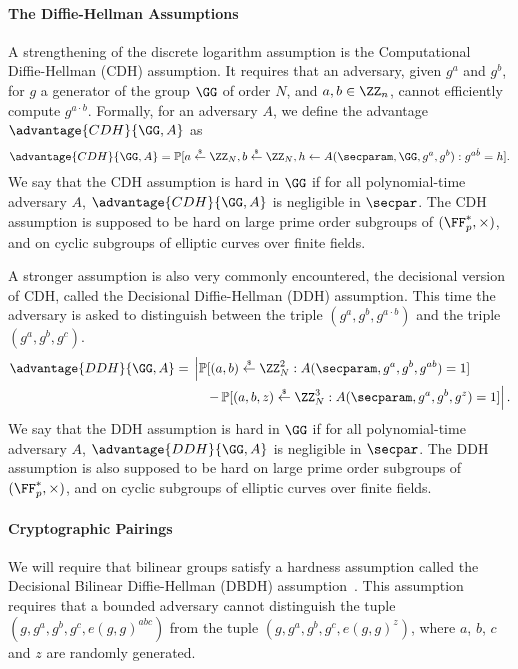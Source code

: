 
\paragraph{The Diffie-Hellman Assumptions} %
\label{par:def_DH}

A strengthening of the discrete logarithm assumption is the Computational Diffie-Hellman (CDH) assumption.
It requires that an adversary, given $g^a$ and $g^b$, for $g$ a generator of the group $\GG$ of order $N$, and $a,b \in \ZZ_n$, cannot efficiently compute $g^{a \cdot b}$.
Formally, for an adversary $A$, we define the advantage $\advantage{CDH}{\GG, A}$ as
\[
	\advantage{CDH}{\GG, A} = \Prob[a \getsr \ZZ_N, b \getsr \ZZ_N, h \gets A(\secparam, \GG, g^a, g^b) :  g^{a \dot b} = h ].
\]
We say that the CDH assumption is hard in $\GG$ if for all polynomial-time adversary $A$, $\advantage{CDH}{\GG, A}$ is negligible in $\secpar$.
The CDH assumption is supposed to be hard on large prime order subgroups of $(\FF_p^*, \times)$, and on cyclic subgroups of elliptic curves over finite fields.

A stronger assumption is also very commonly encountered, the decisional version of CDH, called the Decisional Diffie-Hellman (DDH) assumption.
This time the adversary is asked to distinguish between the triple $(g^a, g^b, g^{a \cdot b})$ and the triple $(g^a, g^b, g^{c})$.
\[
	\advantage{DDH}{\GG, A} = 
				\begin{multlined}[t]
				\left| \Prob[(a,b) \getsr \ZZ_N^2 : A(\secparam, g^a, g^b, g^{ab}) = 1] \right.\\
				\left. - \Prob[(a,b,z) \getsr \ZZ_N^3 : A(\secparam, g^a, g^b, g^{z}) = 1] \right|.
				\end{multlined}
\]
We say that the DDH assumption is hard in $\GG$ if for all polynomial-time adversary $A$, $\advantage{DDH}{\GG, A}$ is negligible in $\secpar$.
The DDH assumption is also supposed to be hard on large prime order subgroups of $(\FF_p^*, \times)$, and on cyclic subgroups of elliptic curves over finite fields.



\paragraph{Cryptographic Pairings} %
\label{par:def_pairings}

We will require that bilinear groups satisfy a hardness assumption called the Decisional Bilinear Diffie-Hellman (DBDH) assumption~\cite{EC:BonBoy04b}.
This assumption requires that a bounded adversary cannot distinguish the tuple $(g, g^a, g^b, g^c, e(g,g)^{abc})$ from the tuple $(g, g^a, g^b, g^c, e(g,g)^z)$, where $a$, $b$, $c$ and $z$ are randomly generated. 


